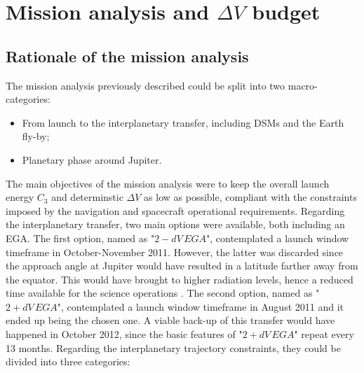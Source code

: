 \section{Mission analysis and \texorpdfstring{$\Delta V$}{Delta-V} budget}
\label{sec:ma_and_dv}

\subsection{Rationale of the mission analysis}
\label{subsec:rationale_ma}

The mission analysis previously described could be split into two macro-categories:
\begin{itemize}
    \item From launch to the interplanetary transfer, including DSMs and the Earth fly-by;
    \item Planetary phase around Jupiter.
\end{itemize}
The main objectives of the mission analysis were to keep the overall launch energy $C_3$ and determinstic $\Delta V$ as low as possible, compliant with the constraints imposed by the navigation and spacecraft operational requirements. Regarding the interplanetary transfer, two main options were available, both including an EGA. The first option, named as "$2- dV\,EGA$", contemplated a launch window timeframe in October-November 2011. However, the latter was discarded since the approach angle at Jupiter would have resulted in a latitude farther away from the equator. This would have brought to higher radiation levels, hence a reduced time available for the science operations \cite{launch_period}. The second option, named as "$2+  dV\,EGA$", contemplated a launch window timeframe in August 2011 and it ended up being the chosen one. A viable back-up of this transfer would have happened in October 2012, since the basic features of "$2+ dV\,EGA$" repeat every 13 months.
Regarding the interplanetary trajectory constraints, they could be divided into three categories:
